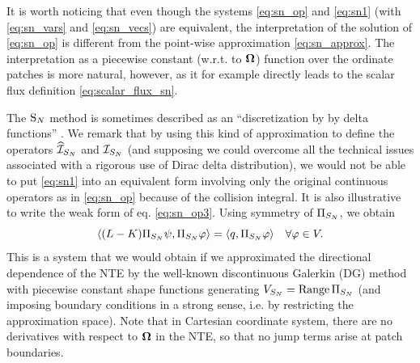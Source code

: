 It is worth noticing that even though the systems \eqref{eq:sn_op}
and \eqref{eq:sn1} (with \eqref{eq:sn_vars} and \eqref{eq:sn_vecs}) are equivalent, the interpretation of the
solution of \eqref{eq:sn_op} is different from the point-wise approximation \eqref{eq:sn_approx}. The interpretation as
a piecewise constant (w.r.t. to $\bomega$) function over the ordinate patches is more natural, however, as it for
example directly leads to the scalar flux definition \eqref{eq:scalar_flux_sn}.
 
The $\SN$ method is sometimes described as an ``discretization by by delta functions'' \cite[p.133]{Chang}.
We remark that by using this kind of approximation to define the operators $\PihSN$ and $\PiSN$ (and supposing we
could overcome all the technical issues associated with a rigorous use of Dirac delta distribution), we would not be able to
put \eqref{eq:sn1} into an equivalent form involving only the original continuous operators as in \eqref{eq:sn_op}
because of the collision integral. It is also illustrative to write the weak form of eq. \eqref{eq:sn_op3}.  
Using symmetry of $\Projop[S_N]$, we obtain 
\begin{equation}\label{eq:SN_weak}
	\langle (\op{L}  - \op{K})\Projop[S_N] \psi, \Projop[S_N] \varphi \rangle = \langle q, \Projop[S_N]
	\varphi \rangle\quad \forall \varphi\in V. 
\end{equation}
This is a system that we would obtain if we approximated the directional dependence of the NTE by the
well-known discontinuous Galerkin (DG) method  with piecewise constant shape functions
generating $V_{S_N} = \Rng \Projop[S_N]$ (and imposing boundary conditions in a strong sense, i.e. by restricting the
approximation space). Note that in Cartesian coordinate system, there are no derivatives with respect to $\bomega$ in
the NTE, so that no jump terms arise at patch boundaries.
 
